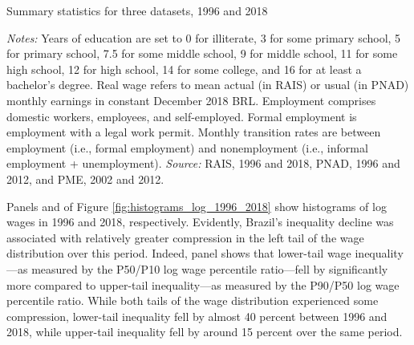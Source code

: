 \begin{table}[!htb]
  \centering
  \caption{Summary statistics for three datasets, 1996 and 2018\label{TABLE: summary statistics}}
  \pretabvspace
  
  \posttabvspace
  \begin{minipage}[t]{1\columnwidth}%
    \begin{spacing}{0.75}
      \emph{\scriptsize{}Notes: }{\scriptsize{}Years of education are set to 0 for illiterate, 3 for some primary school, 5 for primary school, 7.5 for some middle school, 9 for middle school, 11 for some high school, 12 for high school, 14 for some college, and 16 for at least a bachelor's degree. Real wage refers to mean actual (in RAIS) or usual (in PNAD) monthly earnings in constant December 2018 BRL. Employment comprises domestic workers, employees, and self-employed. Formal employment is employment with a legal work permit. Monthly transition rates are between employment (i.e., formal employment) and nonemployment (i.e., informal employment + unemployment). %
      \emph{\scriptsize{}Source: } RAIS, 1996 and 2018, PNAD, 1996 and 2012, and PME, 2002 and 2012.}
    \end{spacing}
  \end{minipage}
\end{table}


Panels  and  of Figure \ref{fig:histograms_log_1996_2018} show histograms of log wages in 1996 and 2018, respectively. Evidently, Brazil's inequality decline was associated with relatively greater compression in the left tail of the wage distribution over this period. Indeed, panel  shows that lower-tail wage inequality---as measured by the P50/P10 log wage percentile ratio---fell by significantly more compared to upper-tail inequality---as measured by the P90/P50 log wage percentile ratio. While both tails of the wage distribution experienced some compression, lower-tail inequality fell by almost 40 percent between 1996 and 2018, while upper-tail inequality fell by around 15 percent over the same period.


